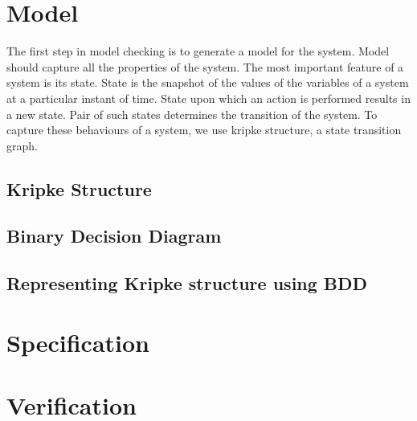 \section{Model}
The first step in model checking is to generate a model for the system. Model should capture all the properties of the system. The most important feature of a system is its state. State is the snapshot of the values of the variables of a system at a particular instant of time. State upon which an action is performed results in a new state. Pair of such states determines the transition of the system. To capture these behaviours of a system, we use kripke structure, a state transition graph.
\subsection{Kripke Structure}

\subsection{Binary Decision Diagram}

\subsection{Representing Kripke structure using BDD}
\label{sec:model_bdd}


\section{Specification}
\label{sec:specification}


\section{Verification}


